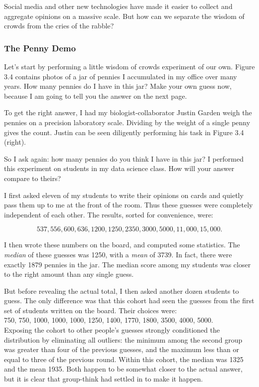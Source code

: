 \documentclass[10pt]{article}
\begin{document}
Social media and other new technologies have made it easier to collect and aggregate opinions on a massive scale. But how can we separate the wisdom of crowds from the cries of the rabble?

\subsubsection{The Penny Demo}

Let's start by performing a little wisdom of crowds experiment of our own. Figure 3.4 contains photos of a jar of pennies I accumulated in my office over many years. How many pennies do I have in this jar? Make your own guess now, because I am going to tell you the answer on the next page.


To get the right answer, I had my biologist-collaborator Justin Garden weigh the pennies on a precision laboratory scale. Dividing by the weight of a single penny gives the count. Justin can be seen diligently performing his task in Figure 3.4 (right).

So I ask again: how many pennies do you think I have in this jar? I performed this experiment on students in my data science class. How will your answer compare to theirs?

I first asked eleven of my students to write their opinions on cards and quietly pass them up to me at the front of the room. Thus these guesses were completely independent of each other. The results, sorted for convenience, were:

\[ 537, 556, 600, 636, 1200, 1250, 2350, 3000, 5000, 11,000, 15,000. \]

I then wrote these numbers on the board, and computed some statistics. The \textit{median} of these guesses was 1250, with a \textit{mean} of 3739. In fact, there were exactly 1879 pennies in the jar. The median score among my students was closer to the right amount than any single guess.

But before revealing the actual total, I then asked another dozen students to guess. The only difference was that this cohort had seen the guesses from the first set of students written on the board. Their choices were:\\
750, 750, 1000, 1000, 1000, 1250, 1400, 1770, 1800, 3500, 4000, 5000.\\
Exposing the cohort to other people's guesses strongly conditioned the distribution by eliminating all outliers: the minimum among the second group was greater than four of the previous guesses, and the maximum less than or equal to three of the previous round. Within this cohort, the median was 1325 and the mean 1935. Both happen to be somewhat closer to the actual answer, but it is clear that group-think had settled in to make it happen.
\end{document}
